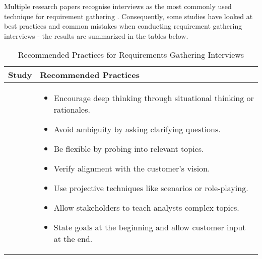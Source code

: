 Multiple research papers recognise interviews as the most commonly used technique for requirement gathering \parencite{interviews5,interviews1,interviews2}. Consequently, some studies have looked at best practices and common mistakes when conducting requirement gathering interviews - the results are summarized in the tables below.
\begin{table}[h!]
    \centering
    \small
    \renewcommand{\arraystretch}{1.2}
    \begin{tabular}{|>{\arraybackslash}m{}|>{\arraybackslash}m{}|}
    \hline
    \textbf{Study} & \textbf{Recommended Practices} \\ \hline
    
    \textcite{interviews4, interviews3} & 
    \vspace{-\topsep}
    \begin{itemize}
        \item Encourage deep thinking through situational thinking or rationales.
        \item Avoid ambiguity by asking clarifying questions.
        \item Be flexible by probing into relevant topics.
        \item Verify alignment with the customer's vision.
        \item Use projective techniques like scenarios or role-playing.
        \item Allow stakeholders to teach analysts complex topics.
        \item State goals at the beginning and allow customer input at the end.
    \end{itemize} \\ \hline
    
    \end{tabular}
    \label{tab:recommended_practices}
    \caption{Recommended Practices for Requirements Gathering Interviews}
\end{table}
    
